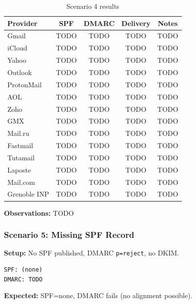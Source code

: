 \documentclass[11pt,a4paper]{article}
\begin{document}
\begin{table}[h]
\centering
\small
\begin{tabular}{lcccc}
\toprule
\textbf{Provider} & \textbf{SPF} & \textbf{DMARC} & \textbf{Delivery} & \textbf{Notes} \\
\midrule
Gmail & TODO & TODO & TODO & TODO \\
iCloud & TODO & TODO & TODO & TODO \\
Yahoo & TODO & TODO & TODO & TODO \\
Outlook & TODO & TODO & TODO & TODO \\
ProtonMail & TODO & TODO & TODO & TODO \\
AOL & TODO & TODO & TODO & TODO \\
Zoho & TODO & TODO & TODO & TODO \\
GMX & TODO & TODO & TODO & TODO \\
Mail.ru & TODO & TODO & TODO & TODO \\
Fastmail & TODO & TODO & TODO & TODO \\
Tutamail & TODO & TODO & TODO & TODO \\
Laposte & TODO & TODO & TODO & TODO \\
Mail.com & TODO & TODO & TODO & TODO \\
Grenoble INP & TODO & TODO & TODO & TODO \\
\bottomrule
\end{tabular}
\caption{Scenario 4 results}
\end{table}

\textbf{Observations:} TODO


\subsubsection{Scenario 5: Missing SPF Record}

\textbf{Setup:} No SPF published, DMARC \texttt{p=reject}, no DKIM.

\begin{lstlisting}
SPF: (none)
DMARC: TODO
\end{lstlisting}

\textbf{Expected:} SPF=none, DMARC fails (no alignment possible).
\end{document}
